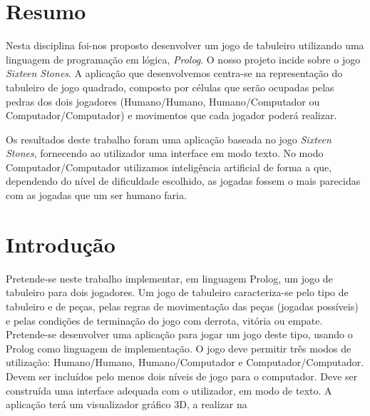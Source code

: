 \documentclass[a4paper]{article}
\begin{document}

\newpage

\section*{Resumo}

Nesta disciplina foi-nos proposto desenvolver um jogo de tabuleiro utilizando uma linguagem de programação em lógica, \textit{Prolog}. O nosso projeto incide sobre o jogo \textit{Sixteen Stones}. A aplicação que desenvolvemos centra-se na representação do tabuleiro de jogo quadrado, composto por células que serão ocupadas pelas pedras dos dois jogadores (Humano/Humano, Humano/Computador ou Computador/Computador) e movimentos que cada jogador poderá realizar.

Os resultados deste trabalho foram uma aplicação baseada no jogo \textit{Sixteen Stones}, fornecendo ao utilizador uma interface em modo texto. No modo Computador/Computador utilizamos inteligência artificial de forma a que, dependendo do nível de dificuldade escolhido, as jogadas fossem o mais parecidas com as jogadas que um ser humano faria.

\newpage

\tableofcontents



\newpage

\section{Introdução}

Pretende-se neste trabalho implementar, em linguagem Prolog, um jogo de tabuleiro para dois jogadores. Um jogo de tabuleiro caracteriza-se pelo tipo de tabuleiro e de peças, pelas regras de movimentação das peças (jogadas possíveis) e pelas condições de terminação do jogo com derrota, vitória ou empate. Pretende-se desenvolver uma aplicação para jogar um jogo deste tipo, usando o Prolog como linguagem de implementação. O jogo deve permitir três modos de utilização: Humano/Humano, Humano/Computador e Computador/Computador. Devem ser incluídos pelo menos dois níveis de jogo para o computador. Deve ser construída uma interface adequada com o utilizador, em modo de texto.
A aplicação terá um visualizador gráfico 3D, a realizar na
\end{document}
